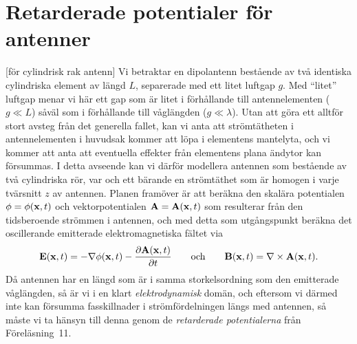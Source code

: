 {{{{{{

\threepointsummary{%
}{%
}{%
}
\vfill\eject\copyrights

\section{Retarderade potentialer f{\"o}r antenner}
[f{\"o}r cylindrisk rak antenn]
Vi betraktar en dipolantenn best{\aa}ende av tv{\aa} identiska cylindriska
element av l{\"a}ngd $L$, separerade med ett litet luftgap $g$. Med ``litet''
luftgap menar vi h{\"a}r ett gap som {\"a}r litet i f{\"o}rh{\aa}llande till
antennelementen ($g\ll L$) s{\aa}v{\"a}l som i f{\"o}rh{\aa}llande till
v{\aa}gl{\"a}ngden ($g\ll\lambda$).
Utan att g{\"o}ra ett alltf{\"o}r stort avsteg fr{\aa}n det generella fallet,
kan vi anta att str{\"o}mt{\"a}theten i antennelementen i huvudsak kommer att
l{\"o}pa i elementens mantelyta, och vi kommer att anta att eventuella effekter
fr{\aa}n elementens plana {\"a}ndytor kan f{\"o}rsummas.
I detta avseende kan vi d{\"a}rf{\"o}r modellera antennen som best{\aa}ende av
tv{\aa} cylindriska r{\"o}r, var och ett b{\"a}rande en str{\"o}mt{\"a}thet som
{\"a}r homogen i varje tv{\"a}rsnitt $z$ av antennen.
\noindent{}
Planen fram{\"o}ver {\"a}r att ber{\"a}kna den skal{\"a}ra potentialen
$\phi=\phi({\bf x},t)$ och vektorpotentialen ${\bf A}={\bf A}({\bf x},t)$ som
resulterar fr{\aa}n den tidsberoende str{\"o}mmen i antennen, och med detta
som utg{\aa}ngs\-punkt ber{\"a}kna det oscillerande emitterade elektromagnetiska
f{\"a}ltet via
$$
  {\bf E}({\bf x},t)
    =-\nabla\phi({\bf x},t)
        -{{\partial{\bf A}({\bf x},t)}\over{\partial t}}
  \qquad\hbox{och}\qquad
  {\bf B}({\bf x},t)
    =\nabla\times{\bf A}({\bf x},t).
$$
D{\aa} antennen har en l{\"a}ngd som {\"a}r i samma storkelsordning som den
emitterade v{\aa}gl{\"a}ngden, s{\aa} {\"a}r vi i en klart {\it elektrodynamisk}
dom{\"a}n, och eftersom vi d{\"a}rmed inte kan f{\"o}rsumma fasskillnader i
str{\"o}mf{\"o}rdelningen l{\"a}ngs med antennen, s{\aa} m{\aa}ste vi ta
h{\"a}nsyn till denna genom de {\it retarderade potentialerna} fr{\aa}n
F{\"o}rel{\"a}sning~11.

}}}}}}
